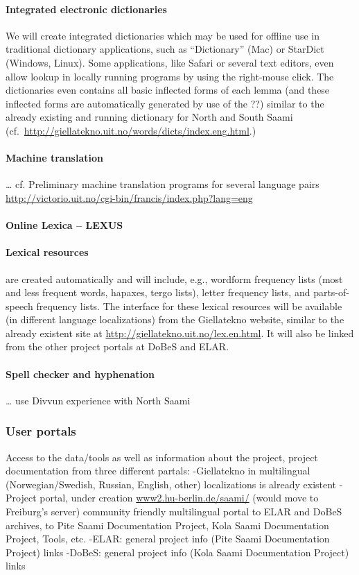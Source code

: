 \documentclass[a4paper,12pt]{article}
\begin{document}
\paragraph{Integrated electronic dictionaries}
We will create integrated dictionaries which may be used for offline use in traditional dictionary applications, such as “Dictionary” (Mac) or StarDict (Windows, Linux). Some applications, like Safari or several text editors, even allow lookup in locally running programs by using the right-mouse click. The dictionaries even contains all basic inflected forms of each lemma (and these inflected forms are automatically generated by use of the ??) similar to the already existing and running dictionary for North and South Saami (cf.~\url{http://giellatekno.uit.no/words/dicts/index.eng.html}.)

\paragraph{Machine translation}%
… cf. Preliminary machine translation programs for several language pairs \url{http://victorio.uit.no/cgi-bin/francis/index.php?lang=eng}

\paragraph{Online Lexica – LEXUS}%

\paragraph{Lexical resources} are created automatically and will include, e.g., wordform frequency lists (most and less frequent words, hapaxes, tergo lists), letter frequency lists, and parts-of-speech frequency lists. The interface for these lexical resources will be available (in different language localizations) from the Giellatekno website, similar to the already existent site at \url{http://giellatekno.uit.no/lex.en.html}. It will also be linked from the other project portals at DoBeS and ELAR.

\paragraph{Spell checker and hyphenation}%
… use Divvun experience with North Saami

\subsubsection{User portals}
Access to the data/tools as well as information about the project, project documentation from three different partals:
-Giellatekno in multilingual (Norwegian/Swedish, Russian, English, other) localizations is already existent
-Project portal, under creation \url{www2.hu-berlin.de/saami/} (would move to Freiburg's server) community friendly multilingual portal to ELAR and DoBeS archives, to Pite Saami Documentation Project, Kola Saami Documentation Project, Tools, etc. 
-ELAR: general project info (Pite Saami Documentation Project) links
-DoBeS: general project info (Kola Saami Documentation Project) links
\end{document}
